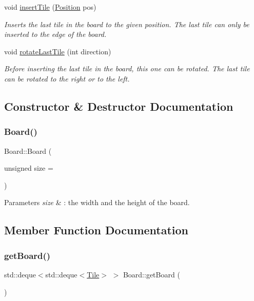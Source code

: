\begin{DoxyCompactItemize}
void \mbox{\hyperlink{classBoard_a1e0143b9611cab65161a2f5f0acd09ea}{insert\+Tile}} (\mbox{\hyperlink{structPosition}{Position}} pos)
\begin{DoxyCompactList}\small\item\em Inserts the last tile in the board to the given position. The last tile can only be inserted to the edge of the board. \end{DoxyCompactList}\item 
void \mbox{\hyperlink{classBoard_a033583c0f7abf2a3fe9626709d380570}{rotate\+Last\+Tile}} (int direction)
\begin{DoxyCompactList}\small\item\em Before inserting the last tile in the board, this one can be rotated. The last tile can be rotated to the right or to the left. \end{DoxyCompactList}\end{DoxyCompactItemize}


\subsection{Constructor \& Destructor Documentation}
\mbox{\label{classBoard_af3091ef5b079f7481c9938192794cf9f}} 
\subsubsection{\texorpdfstring{Board()}{Board()}}
{\footnotesize\ttfamily Board\+::\+Board (\begin{DoxyParamCaption}\item[{unsigned}]{size = {} }\end{DoxyParamCaption})}


\begin{DoxyParams}{Parameters}
{\em size} & \+: the width and the height of the board. \\
\hline
\end{DoxyParams}


\subsection{Member Function Documentation}
\mbox{\label{classBoard_a6b286d61f93eb094b64bd10d16888907}} 
\subsubsection{\texorpdfstring{getBoard()}{getBoard()}}
{\footnotesize\ttfamily std\+::deque$<$std\+::deque$<$\mbox{\hyperlink{classTile}{Tile}}$>$ $>$ Board\+::get\+Board (\begin{DoxyParamCaption}{ }\end{DoxyParamCaption})}


